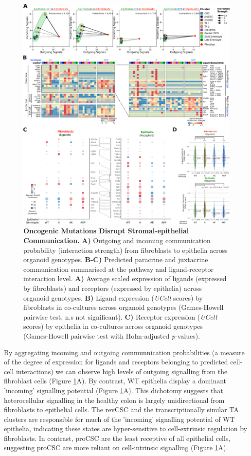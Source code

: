 \begin{figure}
    \centering
    \includegraphics{04seq/figs/4SEQ_CC.png}
    \caption{\textbf{Oncogenic Mutations Disrupt Stromal-epithelial Communication.} \textbf{A)} Outgoing and incoming communication probability (interaction strength) from fibroblasts to epithelia across organoid genotypes. \textbf{B-C)} Predicted paracrine and juxtacrine communication summarised at the pathway and ligand-receptor interaction level. \textbf{A)} Average scaled expression of ligands (expressed by fibroblasts) and receptors (expressed by epithelia) across organoid genotypes. \textbf{B)} Ligand expression (\textit{UCell} scores) by fibroblasts in co-cultures across organoid genotypes (Games-Howell pairwise test, n.s not significant). \textbf{C)} Receptor expression (\textit{UCell} scores) by epithelia in co-cultures across organoid genotypes (Games-Howell pairwise test with Holm-adjusted \textit{p}-values).}
    \label{fig:4cc}
\end{figure}

By aggregating incoming and outgoing communnication probabilities (a measure of the degree of expression for ligands and receptors belonging to predicted cell-cell interactions) we can observe high levels of outgoing signalling from the fibroblast cells (Figure \ref{fig:4cc}A). By contrast, WT epithelia display a dominant 'incoming' signalling potential (Figure \ref{fig:4cc}A). This dichotomy suggests that heterocellular signalling in the healthy colon is largely unidirectional from fibroblasts to epithelial cells. The revCSC and the transcriptionally similar TA clusters are responsible for much of the 'incoming' signalling potential of WT epithelia, indicating these states are hyper-sensitive to cell-extrinsic regulation by fibroblasts. In contrast, proCSC are the least receptive of all epithelial cells, suggesting proCSC are more reliant on cell-intrinsic signalling (Figure \ref{fig:4cc}A). 

